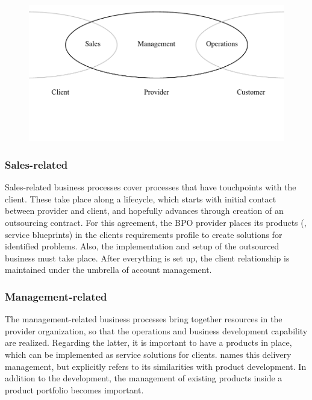 	
	\begin{figure}[caption={BPO chain provider scope with stakeholders}, label={fig:bpochainscope}]
		{	\includegraphics[width=.8\textwidth]{figures/chain2.pdf}}
	\end{figure} 
	
	\subsubsection{Sales-related}
	Sales-related business processes cover processes that have touchpoints with the client. These take place along a lifecycle, which starts with initial contact between provider and client, and hopefully advances through creation of an outsourcing contract. For this agreement, the \acrshort{BPO} provider places its products (\ie, service blueprints) in the clients requirements profile to create solutions for identified problems. Also, the implementation and setup of the outsourced business must take place. After everything is set up, the client relationship is maintained under the umbrella of account management. 
	
	\subsubsection{Management-related}
	The management-related business processes bring together resources in the provider organization, so that the operations and business development capability are realized. Regarding the latter, it is important to have a products in place, which can be implemented as service solutions for clients.  \citep{schewe2007} names this delivery management, but explicitly refers to its similarities with product development. In addition to the development, the management of existing products inside a product portfolio becomes important. 
	
